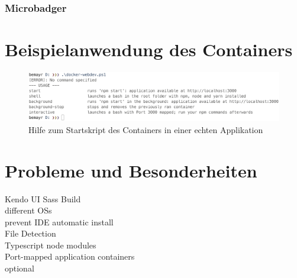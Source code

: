 \subsubsection{Microbadger}
\label{sub:microbadger}


\section{Beispielanwendung des Containers}
\label{sec:example}


\begin{figure}[htbp]
    \centering
    \includegraphics[width=0.95\linewidth,clip]{images/docker-webdev}
    \caption{Hilfe zum Startskript des Containers in einer echten Applikation}
\label{fig:docker-webdev}
\end{figure}


\section{Probleme und Besonderheiten}
\label{sec:container-problems}

\begin{description}
    \item[Kendo UI Sass Build]
    \item[different OSs]
    \item[prevent IDE automatic install]
    \item[File Detection]
    \item[Typescript node modules]
    \item[Port-mapped application containers]
    \item[optional]
\end{description}
